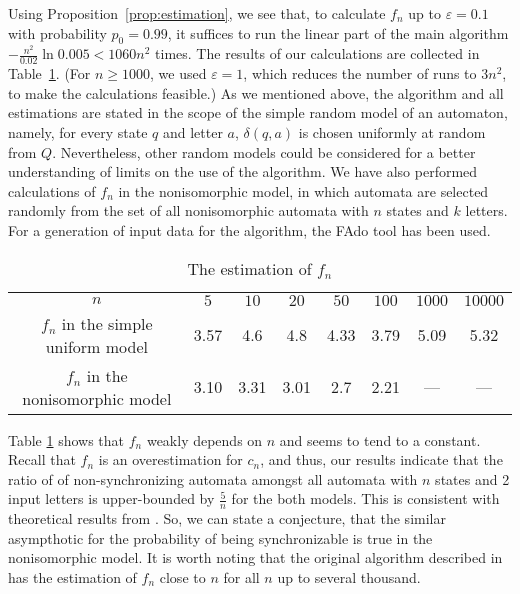 \documentclass{llncs}
\begin{document}
Using Proposition~\ref{prop:estimation}, we see that, to calculate $f_n$ up to $\varepsilon=0.1$ with probability $p_0=0.99$, it suffices to run the linear part of the main algorithm $-\frac{n^2}{0.02} \ln{0.005} < 1060n^2$ times. The results of our calculations are collected in Table~\ref{tab:cn}. (For $n \geq 1000$, we used $\varepsilon=1$, which reduces the number of runs to $3n^2$, to make the calculations feasible.) As we mentioned above, the algorithm and all estimations are stated in the scope of the simple random model of an automaton, namely, for every state $q$ and letter $a$, $\delta(q, a)$ is chosen uniformly at random from $Q$. Nevertheless, other random models could be considered for a better understanding of limits on the use of the algorithm. We have also performed calculations of $f_n$ in the nonisomorphic model, in which automata are selected randomly from the set of all nonisomorphic automata with $n$ states and $k$ letters. For a generation of input data for the algorithm, the FAdo tool \cite{almeida2009fado} has been used.

\begin{table}
\caption{The estimation of $f_n$}
\centering
\begin{tabular}{c|c|c|c|c|c|c|c}
\hline\noalign{\smallskip}
$n$ \quad & \quad $5$ \quad & \quad $10$ \quad & \quad $20$ \quad& \quad$50$ \quad&\quad $100$ \quad&\quad $1000$ \quad& \quad$10000$\\
\noalign{\smallskip}
\hline
\noalign{\smallskip}
  $f_n$ in the simple uniform model \quad & 3.57 & 4.6 & 4.8 & 4.33 & 3.79 & 5.09 & 5.32\\
  $f_n$ in the nonisomorphic model \quad & 3.10 & 3.31 & 3.01 & 2.7 & 2.21 & --- & ---\\
\hline
\end{tabular}
\label{tab:cn}
\end{table}

Table \ref{tab:cn} shows that $f_n$ weakly depends on $n$ and seems to tend to a constant. Recall that $f_n$ is an overestimation for $c_n$, and thus, our results indicate that the ratio of of non-synchronizing automata amongst all automata with $n$ states and 2 input letters is upper-bounded by $\frac{5}{n}$ for the both models. This is consistent with theoretical results from \cite{berl,Berlinkov:preprint}. So, we can state a conjecture, that the similar asympthotic for the probability of being synchronizable is true in the nonisomorphic model. It is worth noting that the original algorithm described in \cite{Berlinkov:preprint} has the estimation of $f_n$ close to $n$ for all $n$ up to several thousand.
\end{document}
